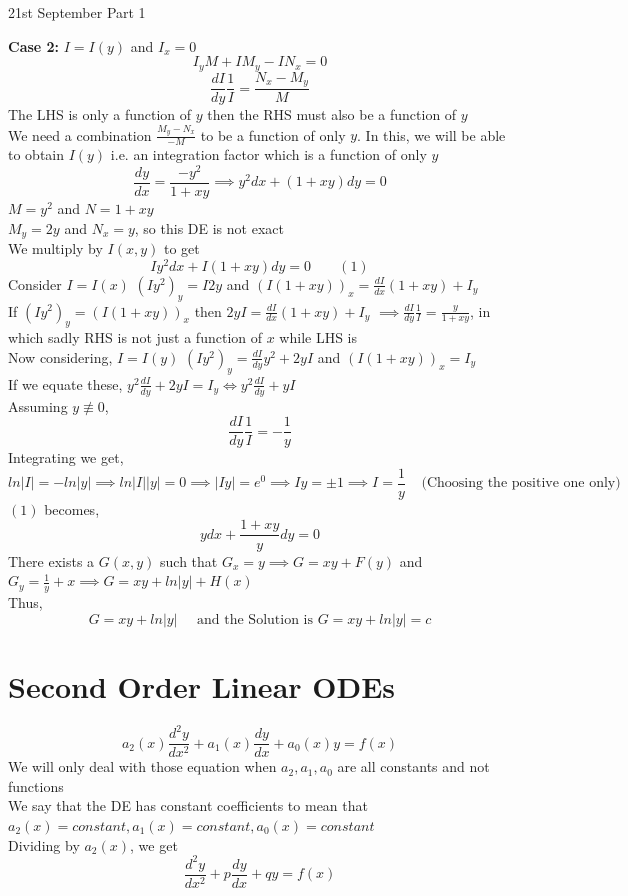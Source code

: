 \documentclass[11pt]{article}
\theoremstyle{definition}
\begin{document}
\begin{center}
    {\LARGE 21st September Part 1}\\
\end{center}
\textbf{Case 2:}  $I = I(y)$ and $I_x = 0$
$$I_yM + IM_y -IN_x = 0$$
$$\frac{dI}{dy}\frac{1}{I} = \frac{N_x-M_y}{M}$$
The LHS is only a function of $y$ then the RHS must also be a function of $y$\\
We need a combination $\frac{M_y-N_x}{-M}$ to be a function of only $y$. In this, we will be able to obtain $I(y)$ i.e. an integration factor which is a function of only $y$\\
$$\frac{dy}{dx} = \frac{-y^2}{1+xy} \implies y^2dx + (1+xy)dy = 0$$
$M = y^2$ and $N=1+xy$\\
$M_y = 2y$ and $N_x = y$, so this DE is not exact\\
We multiply by $I(x,y)$ to get $$Iy^2dx + I(1+xy)dy = 0 \;\;\;\;\;\;\; (1)$$
Consider $I = I(x)$
$(Iy^2)_y = I2y$ and $(I(1+xy))_x =  \frac{dI}{dx}(1+xy) + I_y$\\
If $(Iy^2)_y = (I(1+xy))_x$ then $2yI = \frac{dI}{dx}(1+xy) + I_y$
$\implies \frac{dI}{dy}\frac{1}{I} = \frac{y}{1+xy}$, in which sadly RHS is not just a function of $x$ while LHS is\\
Now considering, $I = I(y)$
$(Iy^2)_y = \frac{dI}{dy}y^2 + 2yI$ and $(I(1+xy))_x = I_y $\\
If we equate these, $y^2\frac{dI}{dy} + 2yI = I_y \Longleftrightarrow y^2\frac{dI}{dy} + yI$\\
Assuming $y \not \equiv 0$,
$$\frac{dI}{dy}\frac{1}{I} = -\frac{1}{y}$$
Integrating we get,
$$ln|I| = -ln|y| \implies ln|I||y| = 0 \implies |Iy| = e^0 \implies Iy = \pm 1 \implies I = \frac{1}{y} \;\;\;\; \text{(Choosing the positive one only)}$$
$(1)$ becomes,
$$ydx + \frac{1+xy}{y}dy = 0$$
There exists a $G(x,y)$ such that
$G_x = y \implies G= xy + F(y)$ and $G_y = \frac{1}{y} + x \implies G = xy + ln|y| + H(x)$\\
Thus,
$$G = xy + ln|y| \;\;\;\;\; \text{and the Solution is } G = xy + ln|y| = c$$
\section{Second Order Linear ODEs}
$$a_2(x)\frac{d^2y}{dx^2} + a_1(x)\frac{dy}{dx} + a_0(x)y = f(x)$$
We will only deal with those equation when $a_2, a_1, a_0$ are all constants and not functions\\
We say that the DE has constant coefficients to mean that $a_2(x) = constant, a_1(x) = constant, a_0(x) = constant$\\
Dividing by $a_2(x)$, we get $$\frac{d^2y}{dx^2} + p\frac{dy}{dx} + qy = f(x)$$
\end{document}
